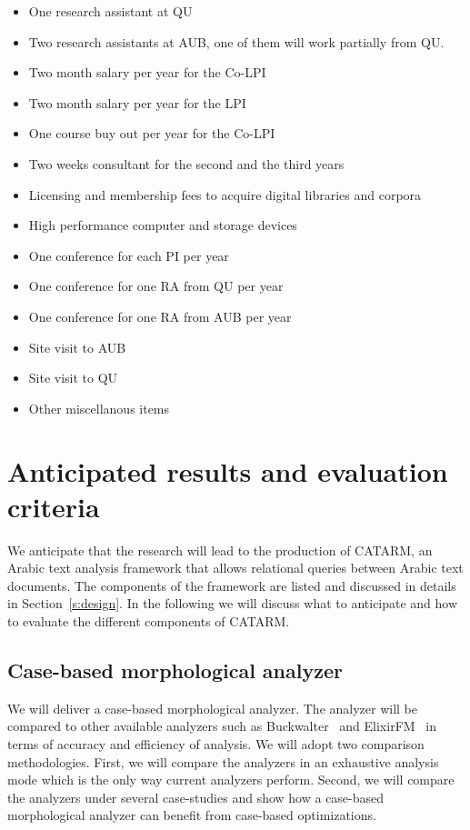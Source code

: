 \documentclass[12pt]{article}
\begin{document}
\begin{itemize}
\item One research assistant at QU
\item Two research assistants at AUB, one of them will 
work partially from QU. 
\item Two month salary per year for the Co-LPI
\item Two month salary per year for the LPI
\item One course buy out per year for the Co-LPI
\item Two weeks consultant for the second and the third years
\item Licensing and membership fees to acquire digital libraries and corpora
\item High performance computer and storage devices
\item One conference for each PI per year
\item One conference for one RA from QU per year
\item One conference for one RA from AUB per year
\item Site visit to AUB 
\item Site visit to QU 
\item Other miscellanous items
\end{itemize}


\section{Anticipated results and evaluation criteria}
\label{s:results}

We anticipate that the research will lead to the production of 
CATARM, an Arabic text analysis framework that allows relational 
queries between Arabic text documents.
The components of the framework are listed and discussed
in details in Section~\ref{s:design}. 
In the following we will discuss what to anticipate and 
how to evaluate the different components of CATARM. 

\subsection{Case-based morphological analyzer} 

We will deliver a case-based morphological analyzer. 
The analyzer will be compared to other available analyzers such as
Buckwalter~\cite{Tim04} and ElixirFM~\cite{Otakar:07} in terms
of accuracy and efficiency of analysis.
We will adopt two comparison methodologies. 
First, we will compare the analyzers in an exhaustive analysis mode
which is the only way current analyzers perform. 
Second, we will compare the analyzers under several case-studies
and show how a case-based morphological analyzer can benefit
from case-based optimizations.
\end{document}
